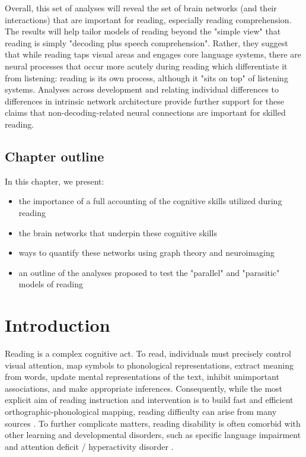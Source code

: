 Overall, this set of analyses will reveal the set of brain networks (and their interactions) that are important for reading, especially reading comprehension. The results will help tailor models of reading beyond the "simple view" that reading is simply "decoding plus speech comprehension". Rather, they suggest that while reading taps visual areas and engages core language systems, there are neural processes that occur more acutely during reading which differentiate it from listening: reading is its own process, although it "sits on top" of listening systems. Analyses across development and relating individual differences to differences in intrinsic network architecture provide further support for these claims that non-decoding-related neural connections are important for skilled reading. 


\subsection{Chapter outline}

In this chapter, we present:
\begin{itemize}
	\item the importance of a full accounting of the cognitive skills utilized during reading
	\item the brain networks that underpin these cognitive skills
	\item ways to quantify these networks using graph theory and neuroimaging
	\item an outline of the analyses proposed to test the "parallel" and "parasitic" models of reading
\end{itemize}


\section{Introduction}
Reading is a complex cognitive act. To read, individuals must precisely control visual attention, map symbols to phonological representations, extract meaning from words, update mental representations of the text, inhibit unimportant associations, and make appropriate inferences. Consequently, while the most explicit aim of reading instruction and intervention is to build fast and efficient orthographic-phonological mapping, reading difficulty can arise from many sources \cite{Pennington2009, vanderLely2010}. To further complicate matters, reading disability is often comorbid with other learning and developmental disorders, such as specific language impairment and attention deficit / hyperactivity disorder \cite{Pennington2006, Margari2013}.

